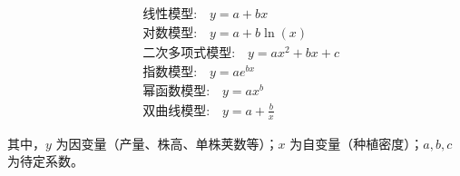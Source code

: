 \documentclass[UTF8,oneside,openany,driverfallback=dvipdfmx,pdfencoding=unicode,hidelinks]{jlutex}
\begin{document}
	\begin{equation}
		\begin{aligned}
			&\textbf{线性模型:} \quad y = a + bx \\
			&\textbf{对数模型:} \quad y = a + b \ln(x) \\
			&\textbf{二次多项式模型:} \quad y = ax^2 + bx + c \\
			&\textbf{指数模型:} \quad y = a e^{bx}\\
			&\textbf{幂函数模型:} \quad y = a x^b \\
			&\textbf{双曲线模型:} \quad y = a + \frac{b}{x}
		\end{aligned}
	\end{equation}
	
	其中，$y$ 为因变量（产量、株高、单株荚数等）；$x$ 为自变量（种植密度）；$a, b, c$ 为待定系数。	
	
\end{document}
